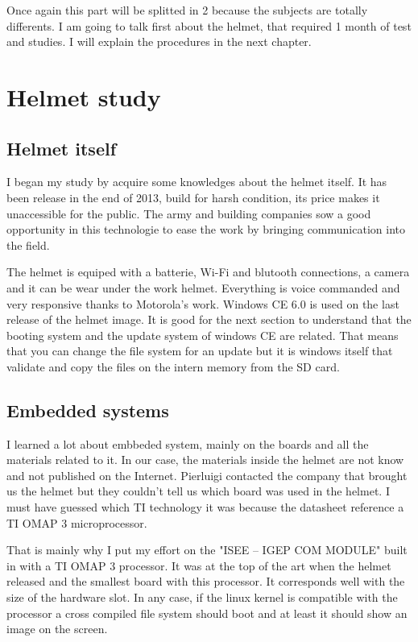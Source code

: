 \documentclass[english,a4paper,11pt]{report}
\begin{document}
	
	
	
	
	\tableofcontents
	\newpage
	
	\setcounter{page}{1}
	
	
	
	
	

	Once again this part will be splitted in 2 because the subjects are totally differents. I am going to talk first about the helmet, that required 1 month of test and studies. I will explain the procedures in the next chapter. 
	
	\section{Helmet study}	
	\subsection{Helmet itself}
	\par I began my study by acquire some knowledges about the helmet itself. It has been release in the end of 2013, build for harsh condition, its price makes it unaccessible for the public. The army and building companies sow a good opportunity in this technologie to ease the work by bringing communication into the field.
	\par The helmet is equiped with a batterie, Wi-Fi and blutooth connections, a camera and it can be wear under the work helmet. Everything is voice commanded and very responsive thanks to Motorola's work. Windows CE 6.0 is used on the last release of the helmet image. It is good for the next section to understand that the booting system and the update system of windows CE are related. That means that you can change the file system for an update but it is windows itself that validate and copy the files on the intern memory from the SD card.
	\subsection{Embedded systems}
	\par I learned a lot about embbeded system, mainly on the boards and all the materials related to it. In our case, the materials inside the helmet are not know and not published on the Internet. Pierluigi contacted the company that brought us the helmet but they couldn't tell us which board was used in the helmet. I must have guessed which TI technology it was because the datasheet reference a TI OMAP 3 microprocessor. 
	\par That is mainly why I put my effort on the "ISEE – IGEP COM MODULE" built in with a TI OMAP 3 processor. It was at the top of the art when the helmet released and the smallest board with this processor. It corresponds well with the size of the hardware slot. In any case, if the linux kernel is compatible with the processor a cross compiled file system should boot and at least it should show an image on the screen.
	
\end{document}
